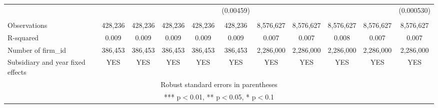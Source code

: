\begin{tabular}{lcccccccccc}
 &  &  &  &  & (0.00459) &  &  &  &  & (0.000530) \\
 &  &  &  &  &  &  &  &  &  &  \\
Observations & 428,236 & 428,236 & 428,236 & 428,236 & 428,236 & 8,576,627 & 8,576,627 & 8,576,627 & 8,576,627 & 8,576,627 \\
R-squared & 0.009 & 0.009 & 0.009 & 0.009 & 0.009 & 0.007 & 0.007 & 0.008 & 0.007 & 0.007 \\
Number of firm\_id & 386,453 & 386,453 & 386,453 & 386,453 & 386,453 & 2,286,000 & 2,286,000 & 2,286,000 & 2,286,000 & 2,286,000 \\
 Subsidiary and year fixed effects & YES & YES & YES & YES & YES & YES & YES & YES & YES & YES \\ \hline
\multicolumn{11}{c}{ Robust standard errors in parentheses} \\
\multicolumn{11}{c}{ *** p$<$0.01, ** p$<$0.05, * p$<$0.1} \\
\end{tabular}
